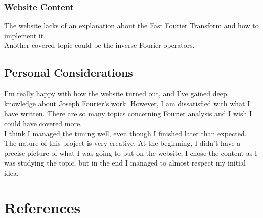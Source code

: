 \documentclass{article}
\begin{document}
\subsubsection{Website Content}

The website lacks of an explanation about the Fast Fourier Transform and how to implement it.
\\
Another covered topic could be the inverse Fourier operators.

\subsection{Personal Considerations}

I'm really happy with how the website turned out, and I've gained deep knowledge about Joseph Fourier's work.
However, I am dissatisfied with what I have written. There are so many topics concerning Fourier analysis and I wish I could have covered more.
\\
I think I managed the timing well, even though I finished later than expected.
\\
The nature of this project is very creative. At the beginning, I didn't have a precise picture of what I was going to
put on the website, I chose the content as I was studying the topic, but in the end I managed to almost respect my initial idea.

\pagebreak

\section{References}

\nocite{*} %

\printbibliography[nottype=online, heading=subbibliography, title=Bibliography]
\printbibliography[type=online, heading=subbibliography, title=Sitography]
\end{document}
